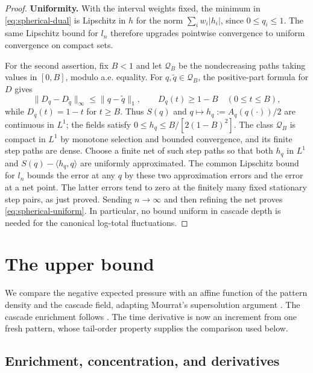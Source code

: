 \documentclass[11pt]{article}
\begin{document}
\begin{proof}
\textbf{Uniformity.}
With the interval weights fixed, the minimum in \eqref{eq:spherical-dual}
is Lipschitz in $h$ for the norm $\sum_iw_i|h_i|$, since $0\le q_i\le1$.
The same Lipschitz bound for $l_n$ therefore upgrades pointwise convergence
to uniform convergence on compact sets.

For the second assertion, fix $B<1$ and let $\mathcal Q_B$ be the
nondecreasing paths taking values in $[0,B]$, modulo a.e. equality.
For $q,\widetilde q\in\mathcal Q_B$, the positive-part formula for $D$ gives
\[
 \|D_q-D_{\widetilde q}\|_\infty\le\|q-\widetilde q\|_1,
 \qquad D_q(t)\ge1-B\quad(0\le t\le B),
\]
while $D_q(t)=1-t$ for $t\ge B$. Thus $S(q)$ and
$q\mapsto h_q:=A_q(q(\cdot))/2$ are continuous in $L^1$; the fields satisfy
$0\le h_q\le B/[2(1-B)^2]$.
The class $\mathcal Q_B$ is compact in $L^1$ by monotone selection and
bounded convergence, and its finite step paths are dense. Choose a finite
net of such step paths so that both $h_q$ in $L^1$ and
$S(q)-\langle h_q,q\rangle$ are uniformly approximated. The common
Lipschitz bound for $l_n$ bounds the error at any $q$ by these two
approximation errors and the error at a net point. The latter errors tend
to zero at the finitely many fixed stationary step pairs, as just proved.
Sending $n\to\infty$ and then refining the net proves
\eqref{eq:spherical-uniform}. In particular, no bound uniform in cascade
depth is needed for the canonical log-total fluctuations.
\end{proof}

\section{The upper bound}\label{sec:upper}

We compare the negative expected pressure with an affine function of the
pattern density and the cascade field, adapting Mourrat's supersolution
argument \cite[Section~4, proof of Theorem~4.1]{Mourrat2021Nonconvex}.
The cascade enrichment follows \cite[Equation~(1.6)]{MourratPanchenko2020}.
The time derivative is now an increment from one fresh pattern, whose
tail-order property supplies the comparison used below.

\subsection{Enrichment, concentration, and derivatives}
\end{document}
